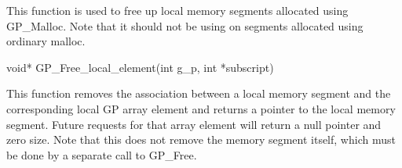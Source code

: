\documentclass[12pt]{article}
\begin{document}
\local

\begin{desc}

This function is used to free up local memory segments allocated using
GP_Malloc. Note that it should not be using on segments allocated using ordinary
malloc.

\end{desc}



\begin{capi}
\begin{ccode}
void* GP_Free_local_element(int g_p, int *subscript)
\begin{funcargs}
\end{funcargs}
\end{ccode}
\end{capi}

\local

\begin{desc}

This function removes the association between a local memory segment and the
corresponding local GP array element and returns a pointer to the local memory
segment. Future requests for that array element
will return a null pointer and zero size. Note that this does not remove the
memory segment itself, which must be done by a separate call to GP_Free.

\end{desc}

\end{document}
